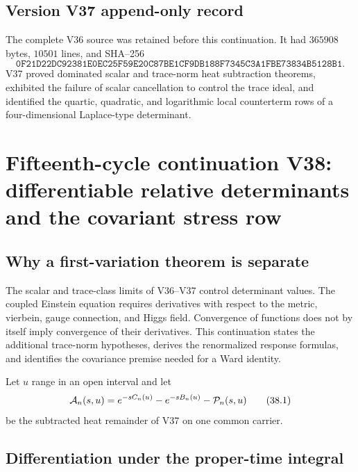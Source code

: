\documentclass[11pt]{article}
\theoremstyle{remark}
\begin{document}
\section*{Version V37 append-only record}
The complete V36 source was retained before this continuation.  It
had \(365908\) bytes, \(10501\) lines, and SHA--256
\[
 \texttt{0F21D22DC92381E0EC25F59E20C87BE1CF9DB188F7345C3A1FBE73834B5128B1}.
\]
V37 proved dominated scalar and trace-norm heat subtraction
theorems, exhibited the failure of scalar cancellation to control
the trace ideal, and identified the quartic, quadratic, and
logarithmic local counterterm rows of a four-dimensional
Laplace-type determinant.

\chapter{Fifteenth-cycle continuation V38: differentiable relative determinants and the covariant stress row}
\label{sec:v15v38}

\section{Why a first-variation theorem is separate}

The scalar and trace-class limits of V36--V37 control determinant
values.  The coupled Einstein equation requires derivatives with
respect to the metric, vierbein, gauge connection, and Higgs field.
Convergence of functions does not by itself imply convergence of
their derivatives.  This continuation states the additional
trace-norm hypotheses, derives the renormalized response formulas,
and identifies the covariance premise needed for a Ward identity.

Let \(u\) range in an open interval and let
\[
 {\cal A}_n(s,u)=e^{-sC_n(u)}-e^{-sB_n(u)}
                 -{\cal P}_n(s,u)                       \tag{38.1}
\]
be the subtracted heat remainder of V37 on one common carrier.

\section{Differentiation under the proper-time integral}
\end{document}
